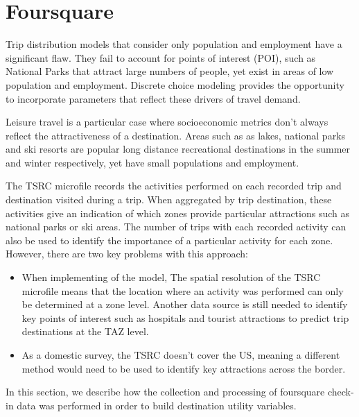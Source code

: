 \section{Foursquare}
\label{section:foursquare}
\label{section:data-foursquare}
Trip distribution models that consider only population and employment have a significant flaw. They fail to account for points of interest (POI), such as National Parks that attract large numbers of people, yet exist in areas of low population and employment. Discrete choice modeling provides the opportunity to incorporate parameters that reflect these drivers of travel demand. 
	
Leisure travel is a particular case where socioeconomic metrics don't always reflect the attractiveness of a destination. Areas such as as lakes, national parks and ski resorts are popular long distance recreational destinations in the summer and winter respectively, yet have small populations and employment. 
	
The TSRC microfile records the activities performed on each recorded trip and destination visited during a trip. When aggregated by trip destination, these activities give an indication of which zones provide particular attractions such as national parks or ski areas. The number of trips with each recorded activity can also be used to identify the importance of a particular activity for each zone. However, there are two key problems with this approach:

\begin{itemize}
\item When implementing of the model,  The spatial resolution of the TSRC microfile means that the location where an activity was performed can only be determined at a zone level. Another data source is still needed to identify key points of interest such as hospitals and tourist attractions to predict trip destinations at the TAZ level.
\item As a domestic survey, the TSRC doesn't cover the US, meaning a different method would need to be used to identify key attractions across the border.
\end{itemize}	
In this section, we describe how the collection and processing of foursquare check-in data was performed in order to build destination utility variables.

